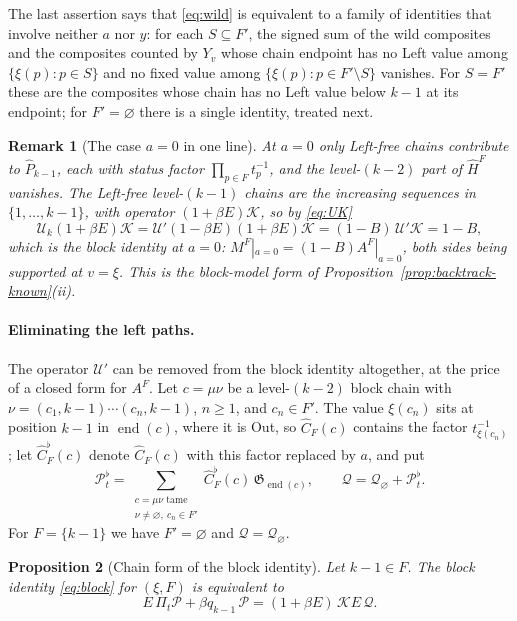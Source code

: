 \documentclass[11pt]{article}
\newtheorem{proposition}{Proposition}
\newtheorem{remark}[proposition]{Remark}
\newcommand{\G}{\mathfrak{G}}
\begin{document}
The last assertion says that \eqref{eq:wild} is equivalent to a family
of identities that involve neither $a$ nor $y$: for each
$S\subseteq F'$, the signed sum of the wild composites and the
composites counted by $Y_v$ whose chain endpoint has no Left value
among $\{\xi(p):p\in S\}$ and no fixed value among
$\{\xi(p):p\in F'\setminus S\}$ vanishes. For $S=F'$ these are the
composites whose chain has no Left value below $k-1$ at its endpoint;
for $F'=\varnothing$ there is a single identity, treated next.

\begin{remark}[The case $a=0$ in one line]
At $a=0$ only Left-free chains contribute to $\widehat P_{k-1}$, each
with status factor $\prod_{p\in F}t^{-1}_{p}$, and the level-$(k-2)$
part of $\widehat H^F$ vanishes. The Left-free level-$(k-1)$ chains are
the increasing sequences in $\{1,\ldots,k-1\}$, with operator
$(1+\beta E)\mathcal K$, so by \eqref{eq:UK}
\[
 \mathcal U_k(1+\beta E)\mathcal K
 =\mathcal U'(1-\beta E)(1+\beta E)\mathcal K
 =(1-B)\,\mathcal U'\mathcal K=1-B,
\]
which is the block identity at $a=0$: $M^F|_{a=0}=(1-B)A^F|_{a=0}$,
both sides being supported at $v=\xi$. This is the block-model form of
Proposition~\ref{prop:backtrack-known}(ii).
\end{remark}

\paragraph{Eliminating the left paths.}
The operator $\mathcal U'$ can be removed from the block identity
altogether, at the price of a closed form for $A^F$. Let $c=\mu\nu$ be
a level-$(k-2)$ block chain with $\nu=(c_1,k-1)\cdots(c_n,k-1)$,
$n\geq1$, and $c_n\in F'$. The value $\xi(c_n)$ sits at position $k-1$
in $\operatorname{end}(c)$, where it is Out, so $\widehat C_F(c)$
contains the factor $t^{-1}_{\xi(c_n)}$; let $\widehat C^\flat_F(c)$
denote $\widehat C_F(c)$ with this factor replaced by $a$, and put
\[
 \mathcal P^\flat_t=\sum_{\substack{c=\mu\nu\text{ tame}\\ \nu\neq\varnothing,\ c_n\in F'}}
   \widehat C^\flat_F(c)\,\G_{\operatorname{end}(c)},
 \qquad
 \mathcal Q=\mathcal Q_\varnothing+\mathcal P^\flat_t .
\]
For $F=\{k-1\}$ we have $F'=\varnothing$ and $\mathcal Q=\mathcal Q_\varnothing$.

\begin{proposition}[Chain form of the block identity]\label{prop:chain-form}
Let $k-1\in F$. The block identity \eqref{eq:block} for $(\xi,F)$ is
equivalent to
\begin{equation}\label{eq:chain-form}
 E\,\Pi_t\mathcal P+\beta q_{k-1}\,\mathcal P=(1+\beta E)\,\mathcal K E\,\mathcal Q .
\end{equation}
\end{proposition}
\end{document}
